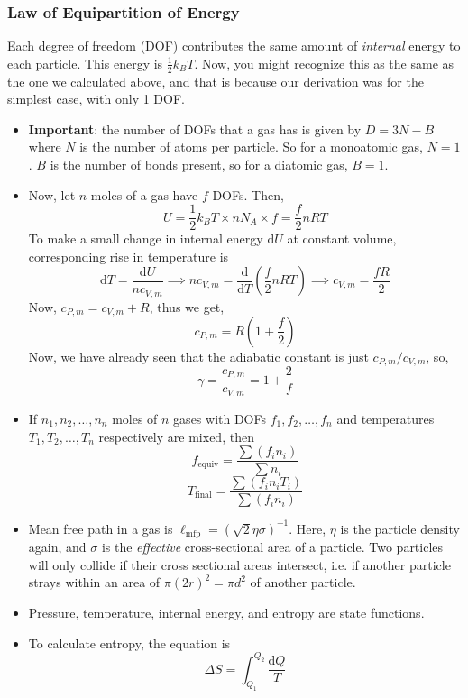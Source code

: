 \documentclass{scrartcl}
\begin{document}
    \subsubsection{Law of Equipartition of Energy}
    Each degree of freedom (DOF) contributes the same amount of \textit{internal} energy to each particle. This energy is $\frac12k_BT$. Now, you might recognize this as the same as the one we calculated above, and that is because our derivation was for the simplest case, with only 1 DOF.
    \begin{itemize}
        \item \textbf{Important}: the number of DOFs that a gas has is given by $D=3N-B$ where $N$ is the number of atoms per particle. So for a monoatomic gas, $N=1$. $B$ is the number of bonds present, so for a diatomic gas, $B=1$.
        \item Now, let $n$  moles of a gas have $f$ DOFs. Then, \[U=\frac12k_BT\times nN_A\times f=\frac f2nRT\] To make a small change in internal energy $\mathrm dU$  at constant volume, corresponding rise in temperature is \[\mathrm dT=\frac{\mathrm dU}{nc_{V,m}}\implies nc_{V,m}=\frac{\mathrm d}{\mathrm dT}\left(\frac f2nRT\right)\implies\boxed{c_{V,m}=\frac{fR}2}\] Now, $c_{P,m}=c_{V,m}+R$, thus we get, \[\boxed{c_{P,m}=R\left(1+\frac f2\right)}\] Now, we have already seen that the adiabatic constant is just $c_{P,m}/c_{V,m}$, so, \[\boxed{\gamma=\frac{c_{P,m}}{c_{V,m}}=1+\frac2f}\]
        \item If $n_1,n_2,\dots,n_n$ moles of $n$ gases with DOFs $f_1,f_2,\dots,f_n$ and temperatures $T_1,T_2,\dots,T_n$ respectively are mixed, then \[f_\text{equiv}=\frac{\sum\left(f_in_i\right)}{\sum n_i}\]\[T_\text{final}=\frac{\sum\left(f_in_iT_i\right)}{\sum \left(f_in_i\right)}\]
        \item Mean free path in a gas is $\ell_\text{mfp}=\left(\sqrt2\eta\sigma\right)^{-1}$. Here, $\eta$ is the particle density again, and $\sigma$ is the \textit{effective} cross-sectional area of a particle. Two particles will only collide if their cross sectional areas intersect, i.e. if another particle strays within an area of $\pi(2r)^2=\pi d^2$ of another particle.
        \item Pressure, temperature, internal energy, and entropy are state functions.
        \item To calculate entropy, the equation is \[\Delta S=\int_{Q_1}^{Q_2}\frac{\mathrm dQ}T\]
    \end{itemize}\newpage
\end{document}
